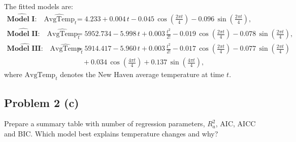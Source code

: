 \documentclass[
  10pt,
]{extarticle}
\begin{document}
The fitted models are:
\begin{align*}
\widehat{\textbf{Model I:}}\quad
\widehat{\text{AvgTemp}}_t
&= 4.233 + 0.004\,t - 0.045\,\cos\!\left(\frac{2\pi t}{4}\right) - 0.096\,\sin\!\left(\frac{2\pi t}{4}\right),\\[6pt]
\widehat{\textbf{Model II:}}\quad
\widehat{\text{AvgTemp}}_t
&= 5952.734 - 5.998\,t + 0.003\,\frac{t^2}{2!} - 0.019\,\cos\!\left(\frac{2\pi t}{4}\right) - 0.078\,\sin\!\left(\frac{2\pi t}{4}\right),\\[6pt]
\widehat{\textbf{Model III:}}\quad
\widehat{\text{AvgTemp}}_t
&= 5914.417 - 5.960\,t + 0.003\,\frac{t^2}{2!} - 0.017\,\cos\!\left(\frac{2\pi t}{4}\right) - 0.077\,\sin\!\left(\frac{2\pi t}{4}\right)\\
&\quad + 0.034\,\cos\!\left(\frac{4\pi t}{4}\right) + 0.137\,\sin\!\left(\frac{4\pi t}{4}\right),
\end{align*}
where \(\text{AvgTemp}_t\) denotes the New Haven average temperature at time \(t\).

\newpage

\subsection{Problem 2 (c)}\label{problem-2-c}

\begin{problem}[Problem 2 (c)]
Prepare a summary table with number of regression parameters, \(R_a^2\), AIC, AICC and BIC. Which model best explains temperature changes and why?
\end{problem}
\end{document}
